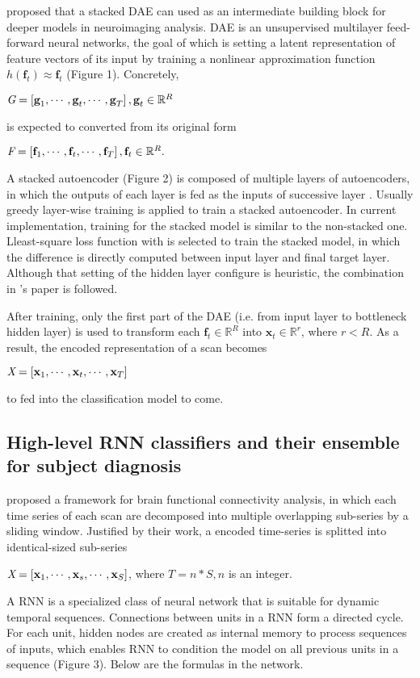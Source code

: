 \textcite{suk16} proposed that a stacked DAE can used as an intermediate building block for deeper models in neuroimaging analysis. DAE is an unsupervised multilayer feed-forward neural networks, the goal of which is setting a latent representation of feature vectors of its input by training a nonlinear approximation function $h(\textbf{f}_t) \approx \textbf{f}_t$ (Figure 1). Concretely, 
\begin{center}
$\emph{G} = \left[ \textbf{g}_1, \cdots, \textbf{g}_t, \cdots, \textbf{g}_T \right], \textbf{g}_t \in \mathbb{R}^{R}$ 
\end{center}
is expected to converted from its original form 
\begin{center}
$\emph{F} = \left[ \textbf{f}_1, \cdots, \textbf{f}_t, \cdots, \textbf{f}_T \right], \textbf{f}_t \in \mathbb{R}^{R}. $
\end{center} 

A stacked autoencoder (Figure 2) is composed of multiple layers of autoencoders, in which the outputs of each layer is fed as the inputs of successive layer \cite{stackedDAE}. Usually greedy layer-wise training is applied to train a stacked autoencoder. In current implementation, training for the stacked model is similar to the non-stacked one. Lleast-square loss function with  is selected to train the stacked model, in which the difference is directly computed between input layer and final target layer. Although that setting of the hidden layer configure is  heuristic, the combination in \textcite{suk16}'s paper is followed. 

After training, only the first part of the DAE (i.e. from input layer to bottleneck hidden layer) is used to transform each $\textbf{f}_t \in  \mathbb{R}^{R}$ into $ \textbf{x}_t \in  \mathbb{R}^{r}$, where $ r < R$. As a result, the encoded representation of a scan becomes
\begin{center}
$\emph{X} = \left[ \textbf{x}_1, \cdots, \textbf{x}_t, \cdots, \textbf{x}_T \right]$ 
\end{center}
to fed into the classification model to come. 

\subsection{High-level RNN classifiers and their ensemble for subject diagnosis}

\textcite{wee15} proposed a framework for brain functional connectivity analysis, in which each time series of each scan are decomposed into multiple overlapping sub-series by a sliding window. Justified by their work, a encoded time-series is splitted into identical-sized sub-series
\begin{center}
$\emph{X} = \left[ \textbf{x}_1, \cdots, \textbf{x}_s, \cdots, \textbf{x}_{S} \right]$, where $T=n*S, n$ is an integer. 
\end{center}
A RNN is a specialized class of neural network that is suitable for dynamic temporal sequences. Connections between units in a RNN form a directed cycle. For each unit, hidden nodes are created as internal memory to process sequences of inputs, which enables RNN to condition the model on all previous units in a sequence (Figure 3). Below are the formulas in the network.

